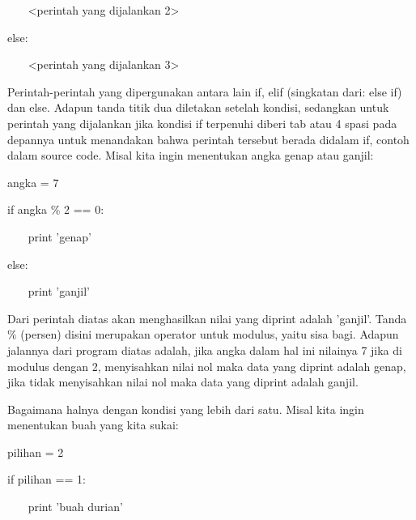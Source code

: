 \noindent 
~~~ <perintah yang dijalankan 2> \par
\vspace{12pt}
\noindent 
else: \par
\vspace{12pt}
\noindent 
~~~ <perintah yang dijalankan 3> \par
\vspace{12pt}
\noindent 
Perintah-perintah yang dipergunakan antara lain $  $if, $  $elif $  $(singkatan dari: $  $else if) dan $  $else. Adapun tanda titik dua diletakan setelah kondisi, sedangkan untuk perintah yang dijalankan jika kondisi if terpenuhi diberi $  $tab $  $atau $  $4 spasi $  $pada depannya untuk menandakan bahwa perintah tersebut berada didalam if, contoh dalam source code. Misal kita ingin menentukan angka genap atau ganjil: \par
\vspace{12pt}
\noindent 
angka = 7 \par
\vspace{12pt}
\noindent 
if angka  $  \%  $ 2 == 0: \par
\vspace{12pt}
\noindent 
~~~ print 'genap' \par
\vspace{12pt}
\noindent 
else: \par
\vspace{12pt}
\noindent 
~~~ print 'ganjil' \par
\vspace{12pt}
\noindent 
Dari perintah diatas akan menghasilkan nilai yang diprint adalah 'ganjil'. Tanda $  $ $  \%  $ $  $(persen) disini merupakan operator untuk modulus, yaitu sisa bagi. Adapun jalannya dari program diatas adalah, jika angka dalam hal ini nilainya 7 jika di modulus dengan 2, menyisahkan nilai nol maka data yang diprint adalah genap, jika tidak menyisahkan nilai nol maka data yang diprint adalah ganjil. \par
\vspace{12pt}
\noindent 
Bagaimana halnya dengan kondisi yang lebih dari satu. Misal kita ingin menentukan buah yang kita sukai: \par
\vspace{12pt}
\noindent 
pilihan = 2 \par
\vspace{12pt}
\noindent 
if pilihan == 1: \par
\vspace{12pt}
\noindent 
~~~ print 'buah durian' \par
